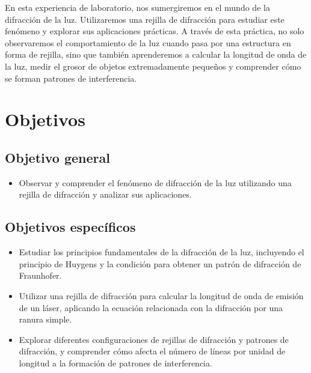 \documentclass[twocolumn, 12pt]{article}
\begin{document}
En esta experiencia de laboratorio, nos sumergiremos en el
mundo de la difracción de la luz. Utilizaremos una rejilla
de difracción para estudiar este fenómeno y explorar sus
aplicaciones prácticas. A través de esta práctica, no solo
observaremos el comportamiento de la luz cuando pasa por
una estructura en forma de rejilla, sino que también
aprenderemos a calcular la longitud de onda de la luz,
medir el grosor de objetos extremadamente pequeños y
comprender cómo se forman patrones de interferencia.

\section{Objetivos}

\subsection{Objetivo general}

\begin{itemize}[label=$\triangleright$]
    \item Observar y comprender el fenómeno de difracción de la luz
          utilizando una rejilla de difracción y analizar sus
          aplicaciones.
\end{itemize}

\subsection{Objetivos específicos}

\begin{itemize}[label=$\triangleright$]
    \item Estudiar los principios fundamentales de la difracción de
          la luz, incluyendo el principio de Huygens y la condición
          para obtener un patrón de difracción de Fraunhofer.

    \item Utilizar una rejilla de difracción para calcular la
          longitud de onda de emisión de un láser, aplicando la
          ecuación relacionada con la difracción por una ranura
          simple.

    \item Explorar diferentes configuraciones de rejillas de
          difracción y patrones de difracción, y comprender cómo
          afecta el número de líneas por unidad de longitud a la
          formación de patrones de interferencia.
\end{itemize}
\end{document}
